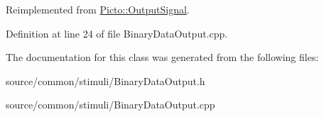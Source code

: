 Reimplemented from \hyperlink{struct_picto_1_1_output_signal_af6516d590c0adf04a169d15cce762368}{Picto\-::\-Output\-Signal}.



Definition at line 24 of file Binary\-Data\-Output.\-cpp.



The documentation for this class was generated from the following files\-:\begin{DoxyCompactItemize}
\item 
source/common/stimuli/Binary\-Data\-Output.\-h\item 
source/common/stimuli/Binary\-Data\-Output.\-cpp\end{DoxyCompactItemize}
